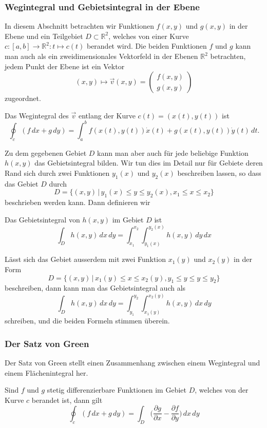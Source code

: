 \subsubsection{Wegintegral und Gebietsintegral in der Ebene}
In diesem Abschnitt betrachten wir Funktionen $f(x,y)$ und $g(x,y)$
in der Ebene und ein Teilgebiet $D\subset \mathbb R^2$, welches
von einer Kurve $c\colon [a,b]\to\mathbb R^2\colon t\mapsto c(t)$
berandet wird.
Die beiden Funktionen $f$ und $g$ kann man auch als ein zweidimensionales
Vektorfeld in der Ebenen $\mathbb R^2$ betrachten, jedem Punkt der
Ebene ist ein Vektor 
\[
(x,y)\mapsto \vec{v}(x,y)=\begin{pmatrix}f(x,y)\\g(x,y)\end{pmatrix}
\]
zugeordnet.

\begin{definition}
Das Wegintegral des $\vec v$ entlang der Kurve $c(t)=(x(t),y(t))$ ist
\[
\oint_c (f\,dx + g\,dy)
= 
\int_a^b f(x(t),y(t)) \dot x(t) + g(x(t),y(t)) \dot y(t)\,dt.
\]
\end{definition}

Zu dem gegebenen Gebiet $D$ kann man aber auch für jede beliebige
Funktion $h(x,y)$ das Gebietsintegral bilden.
Wir tun dies im Detail nur für Gebiete deren Rand sich durch zwei
Funktionen $y_1(x)$ und $y_2(x)$ beschreiben lassen, so dass das
Gebiet $D$ durch
\[
D=\{ (x,y) \,|\, y_1(x) \le y \le y_2(x), x_1\le x\le x_2\}
\]
beschrieben werden kann.
Dann definieren wir

\begin{definition}
Das Gebietsintegral von $h(x,y)$ im Gebiet $D$ ist
\[
\int_D h(x,y)\,dx\,dy = \int_{x_1}^{x_2} \int_{y_1(x)}^{y_2(x)} h(x,y)\,dy\,dx
\]
\end{definition}

Lässt sich das Gebiet ausserdem mit zwei Funktion $x_1(y)$ und $x_2(y)$
in der Form
\[
D=\{(x,y)\,|\, x_1(y)\le x\le x_2(y), y_1\le y\le y\le y_2\}
\]
beschreiben, dann kann man das Gebietsintegral auch als
\[
\int_Dh(x,y)\,dx\,dy
=
\int_{y_1}^{y_2}\int_{x_1(y)}^{x_2(y)} h(x,y)\,dx\,dy
\]
schreiben, und die beiden Formeln stimmen überein.

\subsubsection{Der Satz von Green}
Der Satz von Green stellt einen Zusammenhang zwischen einem Wegintegral
und einem Flächenintegral her.

\begin{satz}[Green]
\label{skript:kruemmung:satz:green}
Sind $f$ und $g$ stetig differenzierbare Funktionen im Gebiet $D$, welches
von der Kurve $c$ berandet ist, dann gilt
\[
\oint_c (f\,dx + g\,dy)
=
\int_D \biggl(\frac{\partial g}{\partial x}
   -\frac{\partial f}{\partial y}\biggr)\,dx\,dy
\]
\end{satz}

